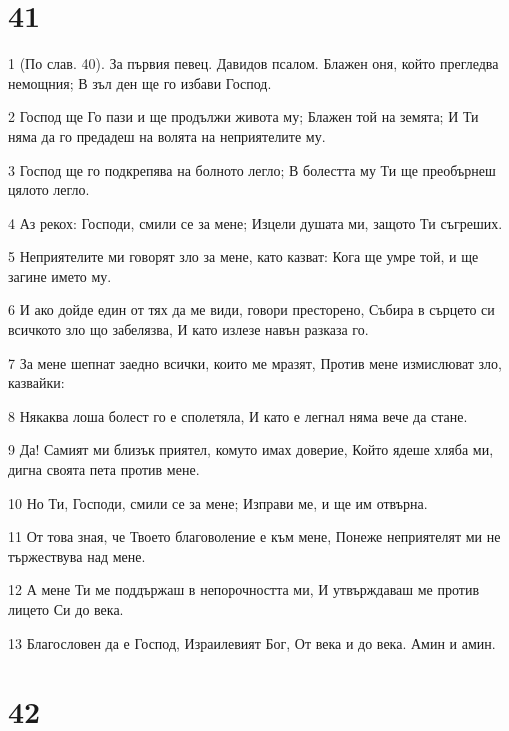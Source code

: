 \chapter{41}

\par 1 (По слав. 40). За първия певец. Давидов псалом. Блажен оня, който прегледва немощния; В зъл ден ще го избави Господ.
\par 2 Господ ще Го пази и ще продължи живота му; Блажен той на земята; И Ти няма да го предадеш на волята на неприятелите му.
\par 3 Господ ще го подкрепява на болното легло; В болестта му Ти ще преобърнеш цялото легло.
\par 4 Аз рекох: Господи, смили се за мене; Изцели душата ми, защото Ти съгреших.
\par 5 Неприятелите ми говорят зло за мене, като казват: Кога ще умре той, и ще загине името му.
\par 6 И ако дойде един от тях да ме види, говори престорено, Събира в сърцето си всичкото зло що забелязва, И като излезе навън разказа го.
\par 7 За мене шепнат заедно всички, които ме мразят, Против мене измислюват зло, казвайки:
\par 8 Някаква лоша болест го е сполетяла, И като е легнал няма вече да стане.
\par 9 Да! Самият ми близък приятел, комуто имах доверие, Който ядеше хляба ми, дигна своята пета против мене.
\par 10 Но Ти, Господи, смили се за мене; Изправи ме, и ще им отвърна.
\par 11 От това зная, че Твоето благоволение е към мене, Понеже неприятелят ми не тържествува над мене.
\par 12 А мене Ти ме поддържаш в непорочността ми, И утвърждаваш ме против лицето Си до века.
\par 13 Благословен да е Господ, Израилевият Бог, От века и до века. Амин и амин.

\chapter{42}

